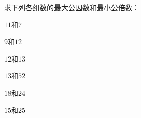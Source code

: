 求下列各组数的最大公因数和最小公倍数：

$11$和$7$		

\vspace{40 pt}
$9$和$12$

\vspace{40 pt}
$12$和$13$

\vspace{40 pt}
$13$和$52$

\vspace{40 pt}
$18$和$24$

\vspace{40 pt}
$15$和$25$


